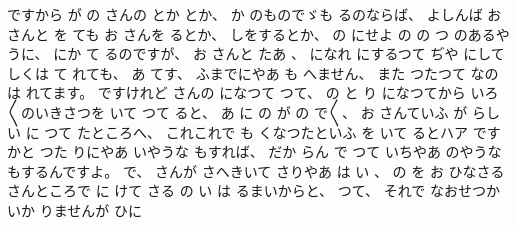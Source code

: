 %
ですから
が
の
さんの
とか
とか、
%
か
のものでゞも
るのならば、
%
よしんば
お
さんと
を
ても
お
さんを
るとか、
%
しをするとか、
%
の
にせよ
の
の
つ
のあるやうに、
%
にか
て
るのですが、
%
お
さんと
たあ
、
%
になれ
にするつて
ぢや
にして
しくは
て
れても、
%
あ
てす、
%
ふまでにやあ
も
へません、
%
また
つたつて
なのは
れてます。
%
ですけれど
さんの
になつて
つて、
%
の
と
り
になつてから
いろ〳〵のいきさつを
いて
つて
ると、
%
あ
に
の
が
の
で〳〵、
%
お
さんていふ
が
らしい
に
つて
たところへ、
%
これこれで
も
くなつたといふ
を
いて
るとハア
ですかと
つた
りにやあ
いやうな
もすれば、
%
だか
らん
で
つて
いちやあ
のやうな
もするんですよ。
%
で、
%
さんが
さへきいて
さりやあ
は
い
、
%
の
を
お
ひなさる
さんところで
に
けて
さる
の
い
は
るまいからと、
%
つて、
%
それで
なおせつかいか
りませんが
ひに
